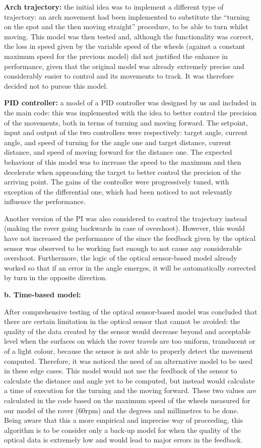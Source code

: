 \documentclass[10pt,twoside]{article}
\begin{document}
\textbf{Arch trajectory:} the initial idea was to implement a different type of trajectory: an arch movement had been implemented to substitute the “turning on the spot and the then moving straight” procedure, to be able to turn whilst moving. This model was then tested and, although the functionality was correct, the loss in speed given by the variable speed of the wheels (against a constant maximum speed for the previous model) did not justified the enhance in performance, given that the original model was already extremely precise and considerably easier to control and its movements to track. It was therefore decided not to pursue this model.

\textbf{PID controller:} a model of a PID controller was designed by us and included in the main code: this was implemented with the idea to better control the precision of the movements, both in terms of turning and moving forward. The setpoint, input and output of the two controllers were respectively: target angle, current angle, and speed of turning for the angle one and target distance, current distance, and speed of moving forward for the distance one. The expected behaviour of this model was to increase the speed to the maximum and then decelerate when approaching the target to better control the precision of the arriving point. The gains of the controller were progressively tuned, with exception of the differential one, which had been noticed to not relevantly influence the performance. 

Another version of the PI was also considered to control the trajectory instead (making the rover going backwards in case of overshoot). However, this would have not increased the performance of the since the feedback given by the optical sensor was observed to be working fast enough to not cause any considerable overshoot. Furthermore, the logic of the optical sensor-based model already worked so that if an error in the angle emerges, it will be automatically corrected by turn in the opposite direction.

\textbf{b.	Time-based model:}

After comprehensive testing of the optical sensor-based model was concluded that there are certain limitation in the optical sensor that cannot be avoided: the quality of the data created by the sensor would decrease beyond and acceptable level when the surfaces on which the rover travels are too uniform, translucent or of a light colour, because the sensor is not able to properly detect the movement computed. Therefore, it was noticed the need of an alternative model to be used in these edge cases. This model would not use the feedback of the sensor to calculate the distance and angle yet to be computed, but instead would calculate a time of execution for the turning and the moving forward. These two values are calculated in the code based on the maximum speed of the wheels measured for our model of the rover (60rpm) and the degrees and millimetres to be done.
Being aware that this a more empirical and imprecise way of proceeding, this algorithm is to be consider only a back-up model for when the quality of the optical data is extremely low and would lead to major errors in the feedback.
\end{document}
